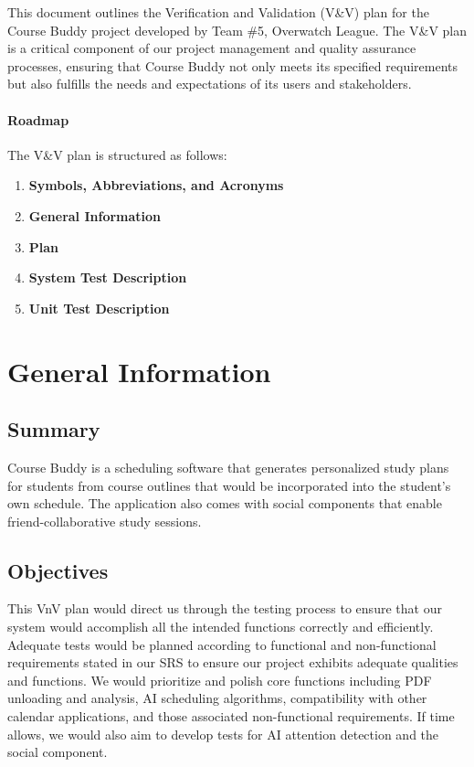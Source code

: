 \documentclass[12pt, titlepage]{article}
\begin{document}
This document outlines the Verification and Validation (V\&V) plan for the Course Buddy project developed by Team \#5, Overwatch League. The V\&V plan is a critical component of our project management and quality assurance processes, ensuring that Course Buddy not only meets its specified requirements but also fulfills the needs and expectations of its users and stakeholders.

\paragraph{Roadmap}
The V\&V plan is structured as follows:
\begin{enumerate}
    \item \textbf{Symbols, Abbreviations, and Acronyms}
    \item \textbf{General Information}
    \item \textbf{Plan} 
    \item \textbf{System Test Description} 
    \item \textbf{Unit Test Description}
\end{enumerate}
\section{General Information}

\subsection{Summary}
Course Buddy is a scheduling software that generates personalized study plans for students from course outlines that would be incorporated into the student's own schedule.  The application also comes with social components that enable friend-collaborative study sessions.

\subsection{Objectives}
This VnV plan would direct us through the testing process to ensure that our system would accomplish all the intended functions correctly and efficiently.  
Adequate tests would be planned according to functional and non-functional requirements stated in our SRS to ensure our project exhibits adequate qualities and functions.
We would prioritize and polish core functions including PDF unloading and analysis, AI scheduling algorithms, compatibility with other calendar applications, and those associated non-functional requirements. If time allows, we would also aim to develop tests for AI attention detection and the social component.
\end{document}
